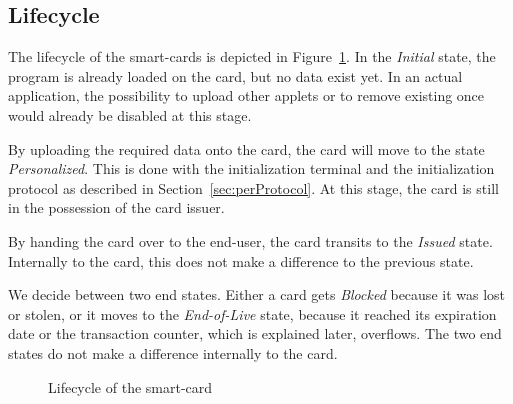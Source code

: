 \subsection{Lifecycle}
The lifecycle of the smart-cards is depicted in Figure~\ref{fig:lifecycle}.
In the \emph{Initial} state, the program is already loaded on the card, but no data exist yet.
In an actual application, the possibility to upload other applets or to remove existing once would already be disabled at this stage.

By uploading the required data onto the card, the card will move to the state \emph{Personalized}.
This is done with the initialization terminal and the initialization protocol as described in Section~\ref{sec:perProtocol}.
At this stage, the card is still in the possession of the card issuer.

By handing the card over to the end-user, the card transits to the \emph{Issued} state.
Internally to the card, this does not make a difference to the previous state.

We decide between two end states.
Either a card gets \emph{Blocked} because it was lost or stolen, or it moves to the \emph{End-of-Live} state, because it reached its expiration date or the transaction counter, which is explained later, overflows.
The two end states do not make a difference internally to the card.

\begin{figure}[h]
    \centering
    
    \caption{Lifecycle of the smart-card}
    \label{fig:lifecycle}
\end{figure}


